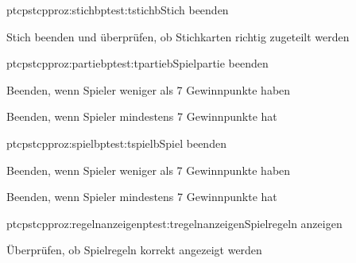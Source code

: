 \begin{description}[leftmargin=3em, style=sameline]
			
	\begin{pftp}{ptc}{pstc}{pproz:stichb}{ptest:tstichb}{Stich beenden}
		\item	Stich beenden und überprüfen, ob Stichkarten richtig zugeteilt werden
	\end{pftp}	
		
	\begin{pftp}{ptc}{pstc}{pproz:partieb}{ptest:tpartieb}{Spielpartie beenden}
		\item Beenden, wenn Spieler weniger als 7 Gewinnpunkte haben
		\item Beenden, wenn Spieler mindestens 7 Gewinnpunkte hat
	\end{pftp}	
		
	\begin{pftp}{ptc}{pstc}{pproz:spielb}{ptest:tspielb}{Spiel beenden}
		\item Beenden, wenn Spieler weniger als 7 Gewinnpunkte haben
		\item Beenden, wenn Spieler mindestens 7 Gewinnpunkte hat
	\end{pftp}	
		
	\begin{pftp}{ptc}{pstc}{pproz:regelnanzeigen}{ptest:tregelnanzeigen}{Spielregeln anzeigen}
		\item	Überprüfen, ob Spielregeln korrekt angezeigt werden
	\end{pftp}	
\end{description}		
